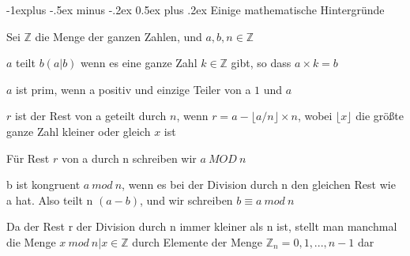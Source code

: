 \documentclass[a4paper]{article}
\makeatletter
\renewcommand{\subsection}{\@startsection{subsection}{2}{0mm}%
 {-1explus -.5ex minus -.2ex}%
 {0.5ex plus .2ex}%
 {\normalfont\normalsize\bfseries}}
\makeatother
\begin{document}
\begin{multicols}{3}
      \subsection{Einige mathematische Hintergründe}
      \begin{itemize*}
            \item Sei $\mathbb{Z}$ die Menge der ganzen Zahlen, und $a,b,n\in\mathbb{Z}$
            \item $a$ teilt $b(a| b)$ wenn es eine ganze Zahl $k\in\mathbb{Z}$ gibt, so dass $a\times k=b$
            \item $a$ ist prim, wenn a positiv und einzige Teiler von a $1$ und $a$
            \item $r$ ist der Rest von a geteilt durch $n$, wenn $r=a-\lfloor a / n \rfloor\times n$, wobei $\lfloor x\rfloor$ die größte ganze Zahl kleiner oder gleich $x$ ist
            \item Für Rest $r$ von a durch n schreiben wir $a\ MOD\ n$
            \item b ist kongruent $a\ mod\ n$, wenn es bei der Division durch n den gleichen Rest wie a hat. Also teilt n $(a-b)$, und wir schreiben $b\equiv a\ mod\ n$
            \item Da der Rest r der Division durch n immer kleiner als n ist, stellt man manchmal die Menge ${x\ mod\ n | x\in\mathbb{Z}}$ durch Elemente der Menge $\mathbb{Z}_n={0, 1, ..., n-1}$ dar
      \end{itemize*}


\end{multicols}
\end{document}
